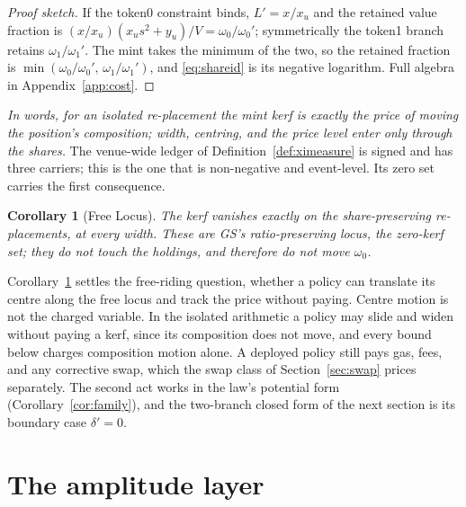 \documentclass[11pt,a4paper]{article}
\theoremstyle{definition}
\theoremstyle{plain}
\newtheorem{corollary}{Corollary}
\theoremstyle{remark}
\begin{document}
\begin{proof}[Proof sketch]
If the token0 constraint binds, $L' = x/x_u$ and the retained value fraction is $(x/x_u)(x_u s^2 + y_u)/V = \omega_0 / \omega_0'$; symmetrically the token1 branch retains $\omega_1/\omega_1'$. 
The mint takes the minimum of the two, so the retained fraction is $\min(\omega_0/\omega_0',\, \omega_1/\omega_1')$, and \eqref{eq:shareid} is its negative logarithm. Full algebra in Appendix~\ref{app:cost}.
\end{proof}

\emph{In words, for an isolated re-placement the mint kerf is exactly the price of moving the position's composition; width, centring, and the price level enter only through the shares.} 
The venue-wide ledger of Definition~\ref{def:ximeasure} is signed and has three carriers; this is the one that is non-negative and event-level. Its zero set carries the first consequence.

\begin{corollary}[Free Locus]\label{cor:free}
The kerf vanishes exactly on the share-preserving re-placements, at every width. These are GS's ratio-preserving locus, the zero-kerf set; they do not touch the holdings, and therefore 
do not move $\omega_0$.
\end{corollary}

Corollary~\ref{cor:free} settles the free-riding question, whether a policy can translate its centre along the free locus and track the price without paying. Centre motion is not the 
charged variable. In the isolated arithmetic a policy may slide and widen without paying a kerf, since its composition does not move, and every bound below charges composition motion alone. 
A deployed policy still pays gas, fees, and any corrective swap, which the swap class of Section~\ref{sec:swap} prices separately. The second act works in the law's potential 
form (Corollary~\ref{cor:family}), and the two-branch closed form of the next section is its boundary case $\delta' = 0$.

\section{The amplitude layer}\label{sec:red-amplitude}
\end{document}
